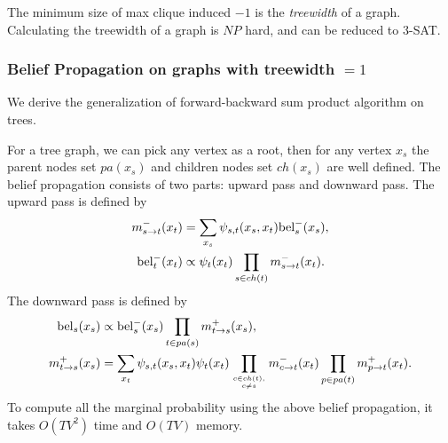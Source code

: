 \documentclass{article}
\begin{document}
The minimum size of max clique induced $-1$ is the \emph{treewidth} of a graph. Calculating the treewidth of a graph is $NP$ hard, and can be reduced to $3$-SAT. 


\subsubsection{Belief Propagation on graphs with treewidth $=1$}
We derive the generalization of forward-backward sum product algorithm on trees.
\begin{center}
\end{center}
For a tree graph, we can pick any vertex as a root, then for any vertex $x_s$ the parent nodes set $pa(x_s)$ and children nodes set $ch(x_s)$ are well defined. The belief propagation consists of two parts: upward pass and downward pass. The upward pass is defined by
\begin{align*}
m_{s\rightarrow t}^-(x_t)&=\sum_{x_s}\psi_{s,t}(x_s,x_t){\rm bel}_s^-(x_s),\\
{\rm bel}_t^-(x_t)&\propto \psi_t(x_t)\prod_{s\in ch(t)}m_{s\rightarrow t}^-(x_t).
\end{align*}
The downward pass is defined by
\begin{align*}
{\rm bel}_s(x_s)&\propto {\rm bel}_s^-(x_s)\prod_{t\in pa(s)}m_{t\rightarrow s}^+(x_s),\\
m_{t\rightarrow s}^+(x_s)&=\sum_{x_t}\psi_{s,t}(x_s,x_t)\psi_t(x_t)\prod_{c\in ch(t),\atop c\neq s}m_{c\rightarrow t}^-(x_t)\prod_{p\in pa(t)}m^+_{p\rightarrow t}(x_t).
\end{align*}
To compute all the marginal probability using the above belief propagation, it takes $O(TV^2)$ time and $O(TV)$ memory.
\end{document}
